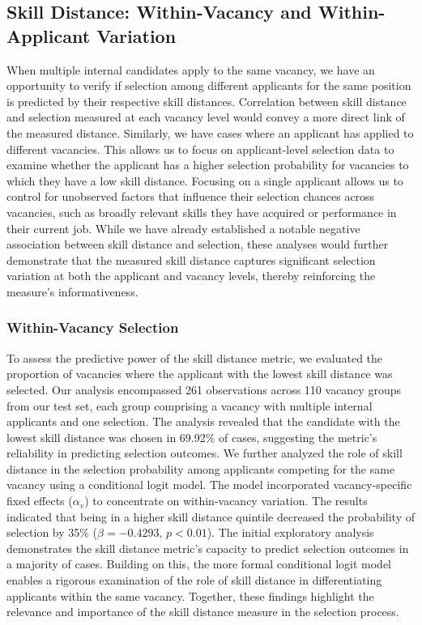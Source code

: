 \documentclass[12pt]{article}
\begin{document}
\subsection{Skill Distance: Within-Vacancy and Within-Applicant Variation}

When multiple internal candidates apply to the same vacancy, we have an opportunity to verify if selection among different applicants for the same position is predicted by their respective skill distances. Correlation between skill distance and selection measured at each vacancy level would convey a more direct link of the measured distance. Similarly, we have cases where an applicant has applied to different vacancies. This allows us to focus on applicant-level selection data to examine whether the applicant has a higher selection probability for vacancies to which they have a low skill distance. Focusing on a single applicant allows us to control for unobserved factors that influence their selection chances across vacancies, such as broadly relevant skills they have acquired or performance in their current job. While we have already established a notable negative association between skill distance and selection, these analyses would further demonstrate that the measured skill distance captures significant selection variation at both the applicant and vacancy levels, thereby reinforcing the measure's informativeness.



\subsubsection{Within-Vacancy Selection}

To assess the predictive power of the skill distance metric, we evaluated the proportion of vacancies where the applicant with the lowest skill distance was selected. Our analysis encompassed 261 observations across 110 vacancy groups from our test set, each group comprising a vacancy with multiple internal applicants and one selection. The analysis revealed that the candidate with the lowest skill distance was chosen in 69.92\% of cases, suggesting the metric's reliability in predicting selection outcomes. We further analyzed the role of skill distance in the selection probability among applicants competing for the same vacancy using a conditional logit model. The model incorporated vacancy-specific fixed effects ($\alpha_v$) to concentrate on within-vacancy variation. The results indicated that being in a higher skill distance quintile decreased the probability of selection by 35\% ($\beta = -0.4293$, $p < 0.01$). The initial exploratory analysis demonstrates the skill distance metric's capacity to predict selection outcomes in a majority of cases. Building on this, the more formal conditional logit model enables a rigorous examination of the role of skill distance in differentiating applicants within the same vacancy. Together, these findings highlight the relevance and importance of the skill distance measure in the selection process. 
\end{document}
